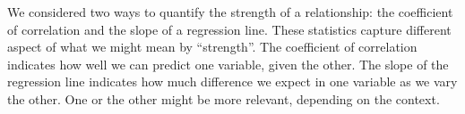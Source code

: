 We considered two ways to quantify the strength of a relationship: the
coefficient of correlation and the slope of a regression line. These
statistics capture different aspect of what we might mean by
``strength''. The coefficient of correlation indicates how well we can
predict one variable, given the other. The slope of the regression line
indicates how much difference we expect in one variable as we vary the
other. One or the other might be more relevant, depending on the
context.
